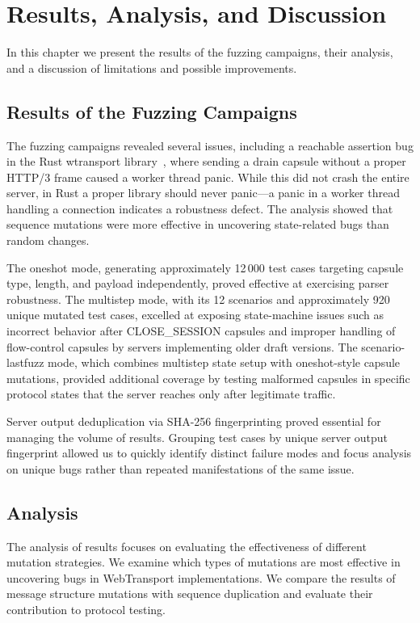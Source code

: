 \chapter{Results, Analysis, and Discussion}
\label{chap:results}

In this chapter we present the results of the fuzzing campaigns, their analysis, and a discussion of limitations and possible improvements.

\section{Results of the Fuzzing Campaigns}

The fuzzing campaigns revealed several issues, including a reachable assertion bug in the Rust wtransport library~\cite{wtransport_github}, where sending a drain capsule without a proper HTTP/3 frame caused a worker thread panic. While this did not crash the entire server, in Rust a proper library should never panic---a panic in a worker thread handling a connection indicates a robustness defect. The analysis showed that sequence mutations were more effective in uncovering state-related bugs than random changes.

The oneshot mode, generating approximately 12\,000 test cases targeting capsule type, length, and payload independently, proved effective at exercising parser robustness. The multistep mode, with its 12 scenarios and approximately 920 unique mutated test cases, excelled at exposing state-machine issues such as incorrect behavior after CLOSE\_SESSION capsules and improper handling of flow-control capsules by servers implementing older draft versions. The scenario-lastfuzz mode, which combines multistep state setup with oneshot-style capsule mutations, provided additional coverage by testing malformed capsules in specific protocol states that the server reaches only after legitimate traffic.

Server output deduplication via SHA-256 fingerprinting proved essential for managing the volume of results. Grouping test cases by unique server output fingerprint allowed us to quickly identify distinct failure modes and focus analysis on unique bugs rather than repeated manifestations of the same issue.

\section{Analysis}

The analysis of results focuses on evaluating the effectiveness of different mutation strategies. We examine which types of mutations are most effective in uncovering bugs in WebTransport implementations. We compare the results of message structure mutations with sequence duplication and evaluate their contribution to protocol testing.

